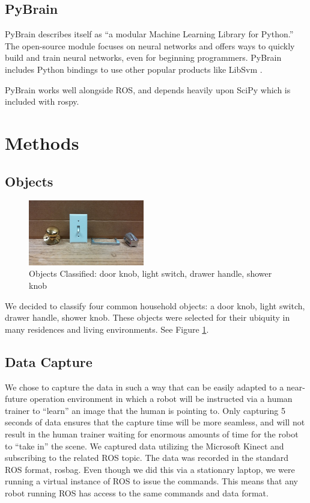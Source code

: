 \documentclass{article}
\begin{document}
\subsection{PyBrain}
PyBrain describes itself as ``a modular Machine Learning Library for Python.'' The open-source module focuses on neural networks and offers ways to quickly build and train neural networks, even for beginning programmers. PyBrain includes Python bindings to use other popular products like LibSvm \cite{pybrain, pybrainCode}.  

PyBrain works well alongside ROS, and depends heavily upon SciPy which is included with rospy.

\section{Methods}
\subsection{Objects}
\begin{figure}[h!]
    \centering
    \includegraphics[width=0.45\textwidth]{All_Knobs.jpg}
    \caption{Objects Classified: door knob, light switch, drawer handle, shower knob}
    \label{fig:objects}
\end{figure}
We decided to classify four common household objects: a door knob, light switch, drawer handle, shower knob. These objects were selected
for their ubiquity in many residences and living environments. See Figure \ref{fig:objects}.

\subsection{Data Capture}

We chose to capture the data in such a way that can be easily adapted to a near-future operation environment in which a robot will be instructed via a human trainer to ``learn'' an image that the human is pointing to.  Only capturing 5 seconds of data ensures that the capture time will be more seamless, and will not result in the human trainer waiting for enormous amounts of time for the robot to ``take in'' the scene.  
We captured data utilizing the Microsoft Kinect and subscribing to the related ROS topic.  The data was recorded in the standard ROS format, rosbag.  Even though we did this via a stationary laptop, we were running a virtual instance of ROS to issue the commands. This means that any robot running ROS has access to the same commands and data format. 
\end{document}
